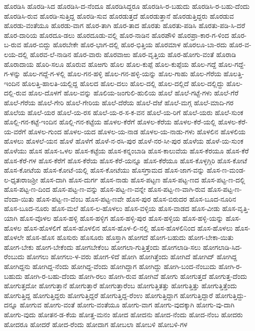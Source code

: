 ಹೊರಡಿಸಿ
ಹೊರಡಿ-ಸಿದ
ಹೊರಡಿಸಿ-ದ-ನೆಂದೂ
ಹೊರಡಿಸಿದ್ದರೂ
ಹೊರಡಿಸಿ-ರ-ಬಹುದು
ಹೊರಡಿಸಿ-ರ-ಬಹು-ದೆಂದು
ಹೊರಡಿಸಿ-ರುವ
ಹೊರಡಿ-ಸುತ್ತಿದ್ದ
ಹೊರಡಿ-ಸುವ
ಹೊರಡುತ್ತದೆ
ಹೊರಡುತ್ತಾನೆ
ಹೊರಡುತ್ತಿದ್ದರು
ಹೊರಡುವ
ಹೊರಡು-ವಂತೆಯೂ
ಹೊರಡು-ವಾಗ
ಹೊರ-ತಾಗಿ
ಹೊರ-ತಾದ
ಹೊರತು
ಹೊರತು-ಪಡಿಸಿ
ಹೊರತು-ಪಡಿ-ಸಿ-ದರೆ
ಹೊರ-ದಾರಿಯ
ಹೊರದೂ-ಡಲು
ಹೊರದೂಡು-ವಲ್ಲಿ
ಹೊರ-ನಾಡಿನ
ಹೊರಪೌಳಿ
ಹೊರಪ್ರಾ-ಕಾರ-ಗ-ಳಿಂದ
ಹೊರ-ಬ-ರುವ
ಹೊರ-ಬಿದ್ದು
ಹೊರಬೇಕೇ
ಹೊರ-ಭಾಗ-ದಲ್ಲಿ
ಹೊರ-ಭಿತ್ತಿಯ
ಹೊರಮಾಳ
ಹೊರಲೂ-ಬಾ-ರದು
ಹೊರ-ವ-ಲಯ-ದಲ್ಲಿ
ಹೊರವ-ಲೆ-ನಾಡಿನ
ಹೊರ-ವಾರು
ಹೊರವಾಱು
ಹೊರ-ವೃತ್ತಿಯ
ಹೊರ-ಹೋಗು-ವಂತೆ
ಹೊರಾಡಿ
ಹೊರಾದಾಯ
ಹೊರಿ-ಸಲೂ
ಹೊರುವ
ಹೊಱಗು
ಹೊಲ
ಹೊಲ-ಕುಪ್ಪೆ
ಹೊಲ-ಕುಪ್ಪೆಯ
ಹೊಲ-ಗದ್ದೆ
ಹೊಲ-ಗದ್ದೆ-ಗ-ಳನ್ನು
ಹೊಲ-ಗದ್ದೆ-ಗ-ಳಲ್ಲಿ
ಹೊಲ-ಗನ-ಹಳ್ಳಿ
ಹೊಲ-ಗನ-ಹಳ್ಳಿ-ಯನ್ನು
ಹೊಲ-ಗಾಹು
ಹೊಲ-ಗೆರೆಯ
ಹೊಲತ್ತಿ-ಇಂದಿನ
ಹೊಲತ್ತಿ-ಹಾಲತಿ-ಯಲ್ಲಿದ್ದ
ಹೊಲದ
ಹೊಲ-ದಲು
ಹೊಲ-ದಲ್ಲಿ
ಹೊಲ-ದಲ್ಲಿದೆ
ಹೊಲ-ದಲ್ಲಿದ್ದು
ಹೊಲ-ದಲ್ಲಿ-ರುವ
ಹೊಲ-ದೊಳಗೆ
ಹೊಲ-ವನ್ನು
ಹೊಲಿಯ-ಜಂಗುಲಿ-ಹುಲಿಯ
ಹೊಲೆ
ಹೊಲೆ-ಗಟ್ಟೆ-ಗಳು
ಹೊಲೆ-ಗೆರೆ
ಹೊಲೆ-ಗೆರೆಯ
ಹೊಲೆ-ಗೇರಿ
ಹೊಲೆ-ಗೇರಿಯ
ಹೊಲೆ-ದೆರೆಯ
ಹೊಲೆ-ದೆಱೆ
ಹೊಲೆ-ಮಗ್ಗ
ಹೊಲೆ-ಮಾದಿ-ಗರ
ಹೊಲೆಯ
ಹೊಲೆ-ಯರ
ಹೊಲೆ-ಯ-ರಸ
ಹೊಲೆ-ಯ-ರ-ಸ-ಕ-ವನ
ಹೊಲೆ-ಯ-ರಿಗೆ
ಹೊಲೆ-ಯರು
ಹೊಲೆ-ಸುಂಕ
ಹೊಲ್ಲಿ-ಗನ-ಕಟ್ಟೆ-ಇಂದಿನ
ಹೊಲ್ಲಿ-ಗನ-ಕಟ್ಟೆಯ
ಹೊಳಲ-ಕೆರೆಗೆ
ಹೊಳಲ-ಕೆರೆಯ
ಹೊಳಲ-ಕೆರೆ-ಯಲ್ಲಿ
ಹೊಳಲ-ಕೆರೆ-ಯ-ವರೆಗೆ
ಹೊಳಲ-ಗುಂದ
ಹೊಳಲ-ಯದ
ಹೊಳಲ-ಯ-ನಾಡ
ಹೊಳಲ-ಯ-ನಾಡು-ಗಳು
ಹೊಳಲಿನ
ಹೊಳಲಿಯ
ಹೊಳಲು
ಹೊಳಲೆ-ಯನ
ಹೊಳೆ
ಹೊಳೆಗೆ
ಹೊಳೆ-ನ-ರಸಿ-ಪುರ
ಹೊಳೆ-ನರ-ಸೀ-ಪುರ
ಹೊಳೆಯ
ಹೊಳೆ-ಯ-ಸುಂಕ
ಹೊಳೆಯು
ಹೊಸ
ಹೊಸ-ಒಳಲ
ಹೊಸ-ಕಟ್ಟೆಯ
ಹೊಸ-ಕನ್ನಂಬಾಡಿ
ಹೊಸ-ಕಾಲುವೆಯ
ಹೊಸ-ಕೆರಯೂ
ಹೊಸ-ಕೆರೆ
ಹೊಸ-ಕೆರೆ-ಗಳ
ಹೊಸ-ಕೆರೆಗೆ
ಹೊಸ-ಕೆರೆಯ
ಹೊಸ-ಕೆರೆ-ಯನ್ನೂ
ಹೊಸ-ಕೆರೆಯೂ
ಹೊಸ-ಕೊಳ್ಳಗ್ಗಿರಿ
ಹೊಸ-ಕೋಟೆ
ಹೊಸ-ಕೋಟೆಯ
ಹೊಸ-ಕೋಟೆ-ಯಲ್ಲಿ
ಹೊಸ-ಕೋಟೆಯು
ಹೊಸಗ್ರಾಮದ
ಹೊಸ-ಜಾಗ-ವನ್ನು
ಹೊಸ-ಣ-ಮಂಡ-ಲ-ಧೃತಃರಾಜಶ್ರೀ
ಹೊಸ-ದಾಗಿ
ಹೊಸ-ದುರ್ಗ
ಹೊಸ-ನಾಡು
ಹೊಸ-ಪಟ್ಟಣ
ಹೊಸ-ಪಟ್ಟ-ಣದ
ಹೊಸ-ಪಟ್ಟ-ಣ-ದಲ್ಲಿ
ಹೊಸ-ಪಟ್ಟ-ಣ-ದಿಂದ
ಹೊಸ-ಪಟ್ಟ-ಣ-ವನ್ನು
ಹೊಸ-ಪಟ್ಟ-ಣ-ವನ್ನೇ
ಹೊಸ-ಪಟ್ಟ-ಣ-ವಾಗಿ-ರುವ
ಹೊಸ-ಪಟ್ಟ-ಣ-ವೆಂದಾ-ಯಿತು
ಹೊಸ-ಪಟ್ಟ-ಣ-ವೆಂಬ
ಹೊಸ-ಪಟ್ಟ-ಣವೇ
ಹೊಸ-ಪುರ
ಹೊಸ-ಬಿರುದರ
ಹೊಸ-ಬೂದ-ನೂರಿನ
ಹೊಸ-ಬೂದ-ನೂರು
ಹೊಸ-ಮಲೆ
ಹೊಸ-ಲ-ಹೊಳಲು
ಹೊಸ-ವಳ್ಳಿಯ
ಹೊಸ-ವಾಡದ
ಹೊಸ-ವೀಡು
ಹೊಸ-ವೃತ್ತಿ-ಯಾಗಿ
ಹೊಸ-ವೊಳಲ
ಹೊಸ-ಹಳ್ಳಿ
ಹೊಸ-ಹಳ್ಳಿಗ
ಹೊಸ-ಹಳ್ಳಿ-ಪುರ
ಹೊಸ-ಹಳ್ಳಿಯ
ಹೊಸ-ಹಳ್ಳಿ-ಯನ್ನು
ಹೊಸ-ಹೊಳಲ
ಹೊಸ-ಹೊಳಲಿಗೆ
ಹೊಸ-ಹೊಳಲಿನ
ಹೊಸ-ಹೊಳ-ಲಿ-ನಲ್ಲಿ
ಹೊಸ-ಹೊಳಲಿನಿಂದ
ಹೊಸ-ಹೊಳಲು
ಹೊಸ-ಹೊಳಲೇ
ಹೊಸ-ಹೊಸ
ಹೊಸುರು
ಹೊಸೂರು
ಹೊಸ್ತಾಗಿ
ಹೋಗದೆ
ಹೋಗ-ಬಹುದು
ಹೋಗ-ಬೇಕಾ-ಯಿತು
ಹೋಗ-ಬೇಕು
ಹೋಗ-ಬೇಕೆಂದು
ಹೋಗಬೇಕೆಂಬ
ಹೋಗಲಾ-ಗುತ್ತಿತ್ತೆಂದು
ಹೋಗಲಾಡಿ-ಸಲು
ಹೋಗಲಾಡಿ-ಸಿದ-ರೆಂಬುದು
ಹೋಗಲು
ಹೋಗಲು-ಳ-ವರು
ಹೋಗ-ಳಿದೆ
ಹೋಗಿ
ಹೋಗಿತ್ತೆಂದು
ಹೋಗಿದೆ
ಹೋಗಿದ್
ಹೋಗಿದ್ದ
ಹೋಗಿದ್ದನು
ಹೋಗಿದ್ದ-ನೆಂದು
ಹೋಗಿದ್ದ-ವೆಂದು
ಹೋಗಿದ್ದಾಗ
ಹೋಗಿದ್ದು
ಹೋಗಿ-ಬಂದ-ನೆಂಬುದು
ಹೋಗಿ-ರ-ಬಹುದು
ಹೋಗಿ-ರ-ಬಹು-ದೆಂದು
ಹೋಗಿ-ರಲು
ಹೋಗಿ-ರುವ
ಹೋಗಿವೆ
ಹೋಗು
ಹೋಗುತ್ತದೆ
ಹೋಗುತ್ತ-ದೆಂದು
ಹೋಗುತ್ತದೋ
ಹೋಗುತ್ತಾನೆ
ಹೋಗುತ್ತಾರೆ
ಹೋಗುತ್ತಾರೆಂಬ
ಹೋಗುತ್ತಿತತ್ತು
ಹೋಗುತ್ತಿತ್ತು
ಹೋಗುತ್ತಿತ್ತೆಂದು
ಹೋಗುತ್ತಿದ್ದ
ಹೋಗುತ್ತಿದ್ದರು
ಹೋಗುತ್ತಿದ್ದರೆ
ಹೋಗುತ್ತಿದ್ದ-ರೆಂಉ
ಹೋಗುತ್ತಿದ್ದಾಗ
ಹೋಗುತ್ತಿದ್ದಾರೆ
ಹೋಗುತ್ತಿದ್ದು-ದನ್ನೂ
ಹೋಗುವ
ಹೋಗು-ವಂತೆ
ಹೋಗು-ವಂತೆಯೂ
ಹೋಗು-ವಾಗ
ಹೋಗು-ವುದಕ್ಕಾಗಿ
ಹೋಗು-ವು-ದಾಗಿ
ಹೋಗು-ವುದು
ಹೋತನ-ಡ-ಕೆಯ
ಹೋತ್ತ-ಮನಂ
ಹೋದ
ಹೋದನು
ಹೋದ-ನೆಂದು
ಹೋದ-ನೆಂಬ
ಹೋದರು
ಹೋದರೂ
ಹೋದರೆ
ಹೋದ-ರೆಂದು
ಹೋದಾಗ
ಹೋಬಲಾ
ಹೋಬಳಿ
ಹೋಬಳಿ-ಗಳ
